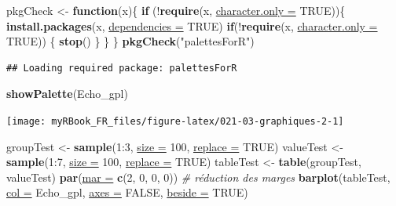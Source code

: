\documentclass[twoside,symmetric]{book}
\newenvironment{Shaded}{}{}
\newcommand{\CommentTok}[1]{\textit{#1}}
\newcommand{\ControlFlowTok}[1]{\textbf{#1}}
\newcommand{\DataTypeTok}[1]{\underline{#1}}
\newcommand{\DecValTok}[1]{#1}
\newcommand{\KeywordTok}[1]{\textbf{#1}}
\newcommand{\NormalTok}[1]{#1}
\newcommand{\OperatorTok}[1]{#1}
\newcommand{\OtherTok}[1]{#1}
\newcommand{\StringTok}[1]{#1}
\begin{document}
\begin{Shaded}
\begin{Highlighting}[]
\NormalTok{pkgCheck <-}\StringTok{ }\ControlFlowTok{function}\NormalTok{(x)\{ }
    \ControlFlowTok{if}\NormalTok{ (}\OperatorTok{!}\KeywordTok{require}\NormalTok{(x, }\DataTypeTok{character.only =} \OtherTok{TRUE}\NormalTok{))\{}
        \KeywordTok{install.packages}\NormalTok{(x, }\DataTypeTok{dependencies =} \OtherTok{TRUE}\NormalTok{)}
        \ControlFlowTok{if}\NormalTok{(}\OperatorTok{!}\KeywordTok{require}\NormalTok{(x, }\DataTypeTok{character.only =} \OtherTok{TRUE}\NormalTok{)) \{}
            \KeywordTok{stop}\NormalTok{()}
\NormalTok{        \}}
\NormalTok{    \}}
\NormalTok{\}}
\KeywordTok{pkgCheck}\NormalTok{(}\StringTok{"palettesForR"}\NormalTok{)}
\end{Highlighting}
\end{Shaded}

\begin{verbatim}
## Loading required package: palettesForR
\end{verbatim}

\begin{Shaded}
\begin{Highlighting}[]
\KeywordTok{showPalette}\NormalTok{(Echo_gpl)}
\end{Highlighting}
\end{Shaded}

\texttt{[image: myRBook\_FR\_files/figure-latex/021-03-graphiques-2-1]}

\begin{Shaded}
\begin{Highlighting}[]
\NormalTok{groupTest <-}\StringTok{ }\KeywordTok{sample}\NormalTok{(}\DecValTok{1}\OperatorTok{:}\DecValTok{3}\NormalTok{, }\DataTypeTok{size =} \DecValTok{100}\NormalTok{, }\DataTypeTok{replace =} \OtherTok{TRUE}\NormalTok{) }
\NormalTok{valueTest <-}\StringTok{ }\KeywordTok{sample}\NormalTok{(}\DecValTok{1}\OperatorTok{:}\DecValTok{7}\NormalTok{, }\DataTypeTok{size =} \DecValTok{100}\NormalTok{, }\DataTypeTok{replace =} \OtherTok{TRUE}\NormalTok{)}
\NormalTok{tableTest <-}\StringTok{ }\KeywordTok{table}\NormalTok{(groupTest, valueTest)}
\KeywordTok{par}\NormalTok{(}\DataTypeTok{mar =} \KeywordTok{c}\NormalTok{(}\DecValTok{2}\NormalTok{, }\DecValTok{0}\NormalTok{, }\DecValTok{0}\NormalTok{, }\DecValTok{0}\NormalTok{)) }\CommentTok{# réduction des marges}
\KeywordTok{barplot}\NormalTok{(tableTest, }
  \DataTypeTok{col =}\NormalTok{ Echo_gpl, }\DataTypeTok{axes =} \OtherTok{FALSE}\NormalTok{, }\DataTypeTok{beside =} \OtherTok{TRUE}\NormalTok{)}
\end{Highlighting}
\end{Shaded}
\end{document}
